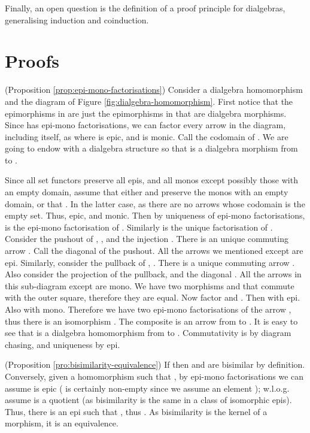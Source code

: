 \documentclass[orivec]{llncs}
\newcommand{\proend}{\medskip}
\renewenvironment{proof}{\begin{pro}}{\proend\end{pro}}
\begin{document}
Finally, an open question is the definition of a proof principle for dialgebras, generalising induction and coinduction.


\small{\vskip -20pt }

\appendix

\section{Proofs}


\begin{proof}(Proposition \ref{prop:epi-mono-factorisations})
	Consider a dialgebra homomorphism  and the diagram of Figure \ref{fig:dialgebra-homomorphism}. First notice that the epimorphisms in  are just the epimorphisms in  that are dialgebra morphisms.
	Since  has epi-mono factorisations, we can factor every arrow  in the diagram, including  itself, as  where  is epic, and  is monic. Call  the codomain of . We are going to endow  with a dialgebra structure  so that  is a dialgebra morphism from  to . 
	
	Since all set functors preserve all epis, and all monos except possibly those with an empty domain, assume that either  and  preserve the monos with an empty domain, or that . In the latter case,  as there are no arrows whose codomain is the empty set. Thus,  epic, and  monic. Then by uniqueness of epi-mono factorisations,  is the epi-mono factorisation of . Similarly  is the unique factorisation of . Consider the pushout  of , , and the injection . There is an unique commuting arrow . Call  the diagonal of the pushout. All the arrows we mentioned except  are epi. Similarly, consider the pullback  of , . There is a unique commuting arrow . Also consider the projection  of the pullback, and the diagonal . All the arrows in 
this sub-diagram except  are mono. We have two morphisms  and  that commute with the outer square, therefore they are equal. Now factor  and . Then  with  epi. Also  with  mono. Therefore we have two epi-mono factorisations  of the arrow , thus there is an isomorphism . The composite  is an arrow from  to . It is easy to see that  is a dialgebra homomorphism from  to . Commutativity is by diagram chasing, and uniqueness by  epi.
\end{proof}


\begin{proof}(Proposition \ref{pro:bisimilarity-equivalence})
    If  then  and  are bisimilar by definition. Conversely, given a homomorphism  such that , by epi-mono factorisations we can assume  is epic ( is certainly non-empty since we assume an element ); w.l.o.g. assume  is a quotient (as bisimilarity is the same in a class of isomorphic epis). Thus, there is an epi  such that , thus . As bisimilarity is the kernel of a morphism, it is an equivalence.
\end{proof}
\end{document}
